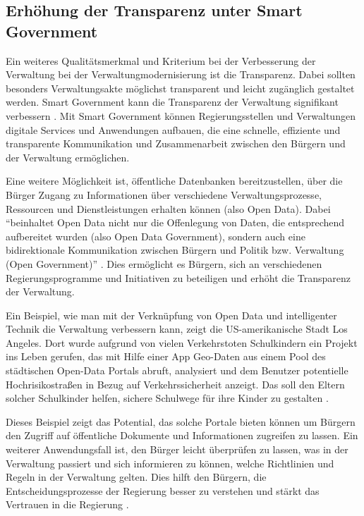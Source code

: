 \subsection{Erhöhung der Transparenz unter Smart Government}
Ein weiteres Qualitätsmerkmal und Kriterium bei der Verbesserung der Verwaltung bei der Verwaltungmodernisierung ist die Transparenz.
Dabei sollten besonders Verwaltungsakte möglichst transparent und leicht zugänglich gestaltet werden.
Smart Government kann die Transparenz der Verwaltung signifikant verbessern \citep[Vgl.][S.87]{Kersting2017}.
Mit Smart Government können Regierungsstellen und Verwaltungen digitale Services und Anwendungen aufbauen, die eine schnelle, effiziente und transparente Kommunikation und Zusammenarbeit zwischen den Bürgern und der Verwaltung ermöglichen. 
\par
Eine weitere Möglichkeit ist, öffentliche Datenbanken bereitzustellen, über die Bürger Zugang zu Informationen über verschiedene Verwaltungsprozesse, Ressourcen und Dienstleistungen erhalten können (also Open Data).
Dabei ``beinhaltet Open Data nicht nur die Offenlegung von Daten, die entsprechend aufbereitet wurden (also Open Data Government), sondern auch eine bidirektionale Kommunikation zwischen Bürgern und Politik bzw. Verwaltung (Open Government)'' \citep[Vgl.][S.94]{Kersting2017}.
Dies ermöglicht es Bürgern, sich an verschiedenen Regierungsprogramme und Initiativen zu beteiligen und erhöht die Transparenz der Verwaltung.
\par
\label{LAVerkehr}
Ein Beispiel, wie man mit der Verknüpfung von Open Data und intelligenter Technik die Verwaltung verbessern kann, zeigt die US-amerikanische Stadt Los Angeles.
Dort wurde aufgrund von vielen Verkehrstoten Schulkindern ein Projekt ins Leben gerufen, das mit Hilfe einer App Geo-Daten aus einem Pool des städtischen Open-Data Portals abruft, analysiert und dem Benutzer potentielle Hochrisikostraßen in Bezug auf Verkehrssicherheit anzeigt.
Das soll den Eltern solcher Schulkinder helfen, sichere Schulwege für ihre Kinder zu gestalten \citep[][]{LAVisionZero2023}.
\par
Dieses Beispiel zeigt das Potential, das solche Portale bieten können um Bürgern den Zugriff auf öffentliche Dokumente und Informationen zugreifen zu lassen.
Ein weiterer Anwendungsfall ist, den Bürger leicht überprüfen zu lassen, was in der Verwaltung passiert und sich informieren zu können, welche Richtlinien und Regeln in der Verwaltung gelten. 
Dies hilft den Bürgern, die Entscheidungsprozesse der Regierung besser zu verstehen und stärkt das Vertrauen in die Regierung \citep[Vgl.][S.94]{Kersting2017}.
